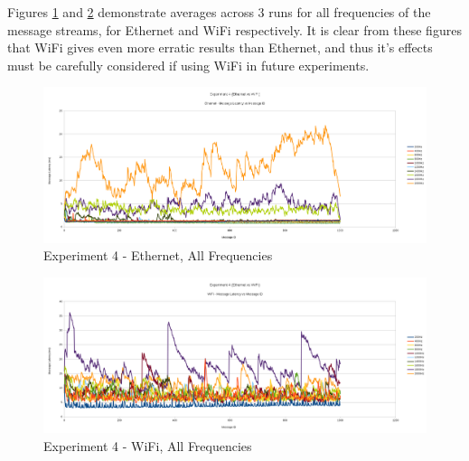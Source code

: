 \documentclass[../dissertation.tex]{subfiles}
\begin{document}
Figures \ref{exp4-ethernet-all-freq} and \ref{exp4-wifi-all-freq} demonstrate averages across 3 runs for all frequencies of the message streams, for Ethernet and WiFi respectively. It is clear from these figures that WiFi gives even more erratic results than Ethernet, and thus it's effects must be carefully considered if using WiFi in future experiments.

\begin{figure}[H]
\centering
\includegraphics[width=\textwidth]{images/experiment4/ethernet_mean_times_pretty.png}
\caption{Experiment 4 - Ethernet, All Frequencies}
\label{exp4-ethernet-all-freq}
\end{figure}

\begin{figure}[H]
\centering
\includegraphics[width=\textwidth]{images/experiment4/wifi_mean_times_pretty.png}
\caption{Experiment 4 - WiFi, All Frequencies}
\label{exp4-wifi-all-freq}
\end{figure}
\end{document}
